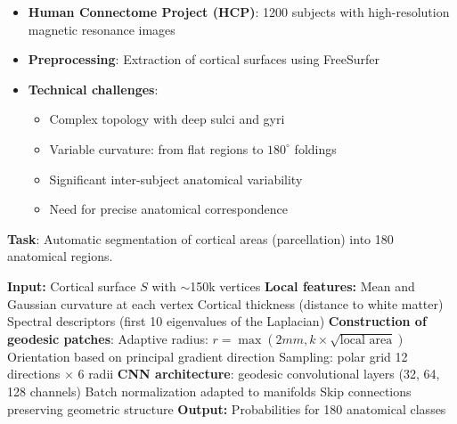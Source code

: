 \begin{itemize}
    \item \textbf{Human Connectome Project (HCP)}: 1200 subjects with high-resolution magnetic resonance images
    \item \textbf{Preprocessing}: Extraction of cortical surfaces using FreeSurfer
    \item \textbf{Technical challenges}:
        \begin{itemize}
            \item Complex topology with deep sulci and gyri
            \item Variable curvature: from flat regions to $180^\circ$ foldings
            \item Significant inter-subject anatomical variability
            \item Need for precise anatomical correspondence
        \end{itemize}
\end{itemize}

\begin{example}

\textbf{Task}: Automatic segmentation of cortical areas (parcellation) into 180 anatomical regions.

\begin{algorithm}[H]
\caption{Geodesic CNN for Cortical Parcellation}
\begin{algorithmic}[1]
    \State \textbf{Input:} Cortical surface $S$ with $\sim$150k vertices
    \State \textbf{Local features:}
    \State \quad Mean and Gaussian curvature at each vertex
    \State \quad Cortical thickness (distance to white matter)
    \State \quad Spectral descriptors (first 10 eigenvalues of the Laplacian)
    \State \textbf{Construction of geodesic patches}:
    \State \quad Adaptive radius: $r = \max(2mm, k \times \sqrt{\text{local area}})$
    \State \quad Orientation based on principal gradient direction
    \State \quad Sampling: polar grid 12 directions $\times$ 6 radii
    \State \textbf{CNN architecture}:
    \State {} geodesic convolutional layers (32, 64, 128 channels)
    \State \quad Batch normalization adapted to manifolds
    \State \quad Skip connections preserving geometric structure
    \State \textbf{Output:} Probabilities for 180 anatomical classes
\end{algorithmic}
\end{algorithm}
\end{example}

